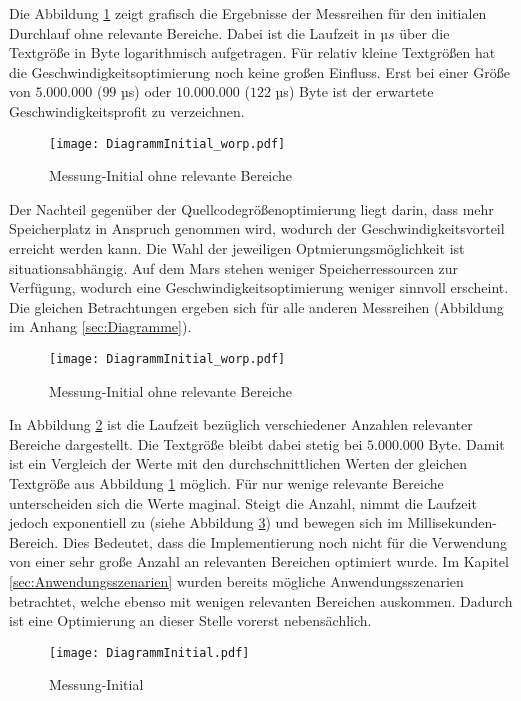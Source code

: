 Die Abbildung \ref{fig:diagrammInitial_worp} zeigt grafisch die Ergebnisse der
Messreihen für den initialen Durchlauf ohne relevante Bereiche. Dabei ist die
Laufzeit in $µs$ über die Textgröße in Byte logarithmisch aufgetragen. Für
relativ kleine Textgrößen hat die Geschwindigkeitsoptimierung noch keine großen
Einfluss. Erst bei einer Größe von $5.000.000$ ($99$ µs) oder
$10.000.000$ ($122$ µs) Byte ist der erwartete Geschwindigkeitsprofit zu
verzeichnen.

\begin{figure}[H]
	\centering
	\texttt{[image: DiagrammInitial\_worp.pdf]}
	\label{fig:diagrammInitial_worp}
	\caption{Messung-Initial ohne relevante Bereiche}
\end{figure}

Der Nachteil gegenüber der Quellcodegrößenoptimierung liegt darin, dass
mehr Speicherplatz in Anspruch genommen wird, wodurch der
Geschwindigkeitsvorteil erreicht werden kann.
Die Wahl der jeweiligen Optmierungsmöglichkeit ist situationsabhängig. Auf dem
Mars stehen weniger Speicherressourcen zur Verfügung, wodurch eine
Geschwindigkeitsoptimierung weniger sinnvoll erscheint. Die gleichen
Betrachtungen ergeben sich für alle anderen Messreihen (Abbildung im Anhang
\ref{sec:Diagramme}). 

\begin{figure}[H]
	\centering
	\texttt{[image: DiagrammInitial\_worp.pdf]}
	\label{fig:diagrammInitial_wrp}
	\caption{Messung-Initial ohne relevante Bereiche}
\end{figure}

In Abbildung \ref{fig:diagrammInitial_wrp} ist die Laufzeit bezüglich
verschiedener Anzahlen relevanter Bereiche dargestellt. Die Textgröße bleibt
dabei stetig bei $5.000.000$ Byte. Damit ist ein Vergleich der Werte mit den
durchschnittlichen Werten der gleichen Textgröße aus Abbildung
\ref{fig:diagrammInitial_worp} möglich. Für nur wenige relevante Bereiche
unterscheiden sich die Werte maginal. Steigt die Anzahl, nimmt die Laufzeit
jedoch exponentiell zu (siehe Abbildung \ref{fig:diagrammInitial}) und bewegen
sich im Millisekunden-Bereich. Dies Bedeutet, dass die Implementierung noch
nicht für die Verwendung von einer sehr große Anzahl an relevanten Bereichen
optimiert wurde. Im Kapitel \ref{sec:Anwendungsszenarien} wurden bereits
mögliche Anwendungsszenarien betrachtet, welche ebenso mit wenigen relevanten
Bereichen auskommen. Dadurch ist eine Optimierung an dieser Stelle vorerst
nebensächlich.

\begin{figure}[H]
	\centering
	\texttt{[image: DiagrammInitial.pdf]}
	\label{fig:diagrammInitial}
	\caption{Messung-Initial}
\end{figure}

